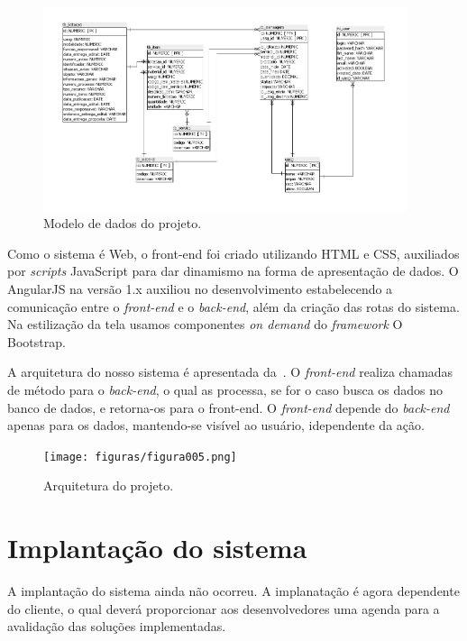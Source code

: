 \begin{figure}
	\includegraphics[width=0.95\textwidth]{figuras/bdAtualizado.png}
	\caption{Modelo de dados do projeto.}
	\label{Figura007}
\end{figure}




Como o sistema é Web, o front-end foi criado utilizando  HTML e CSS, auxiliados por \textit{scripts} JavaScript para dar dinamismo na forma de apresentação de dados.
O AngularJS na versão 1.x auxiliou no desenvolvimento estabelecendo a comunicação entre o \textit{front-end} e o \textit{back-end}, além da criação das rotas do sistema.
Na estilização da tela usamos componentes \textit{on demand} do \textit{framework} O Bootstrap.

A arquitetura do nosso sistema é apresentada da~.
O \textit{front-end} realiza chamadas de método para o \textit{back-end}, o qual as processa, se for o caso busca os dados no banco de dados, e retorna-os para o front-end.
O \textit{front-end} depende do \textit{back-end} apenas para os dados, mantendo-se visível ao usuário, idependente da ação.

\begin{figure}[ht]
    \centering
    \texttt{[image: figuras/figura005.png]}
    \caption{Arquitetura do projeto.}
    \label{Figura005}
\end{figure}

\section{Implantação do sistema}

A implantação do sistema ainda não ocorreu.
A implanatação é agora dependente do cliente, o qual deverá proporcionar aos desenvolvedores uma agenda para a avalidação das soluções implementadas.